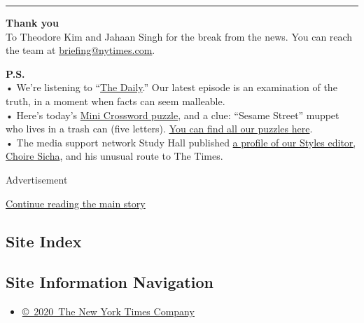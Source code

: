 \begin{center}\rule{0.5\linewidth}{\linethickness}\end{center}

\textbf{Thank you}\\
To Theodore Kim and Jahaan Singh for the break from the news. You can
reach the team at
\href{mailto:briefing+midnight@nytimes.com?subject=Briefing\%20Feedback}{briefing@nytimes.com}.

\textbf{P.S.}\\
• We're listening to ``\href{https://www.nytimes.com/thedaily}{The
Daily}.'' Our latest episode is an examination of the truth, in a moment
when facts can seem malleable.\\
• Here's today's
\href{https://www.nytimes.com/crosswords/game/mini}{Mini Crossword
puzzle}, and a clue: ``Sesame Street'' muppet who lives in a trash can
(five letters). \href{https://www.nytimes.com/crosswords}{You can find
all our puzzles here}.\\
• The media support network Study Hall published
\href{https://www.patreon.com/posts/how-choire-sicha-39592791}{a profile
of our Styles editor, Choire Sicha}, and his unusual route to The Times.

Advertisement

\protect\hyperlink{after-bottom}{Continue reading the main story}

\hypertarget{site-index}{%
\subsection{Site Index}\label{site-index}}

\hypertarget{site-information-navigation}{%
\subsection{Site Information
Navigation}\label{site-information-navigation}}

\begin{itemize}
\tightlist
\item
  \href{https://help.nytimes.com/hc/en-us/articles/115014792127-Copyright-notice}{©~2020~The
  New York Times Company}
\end{itemize}

